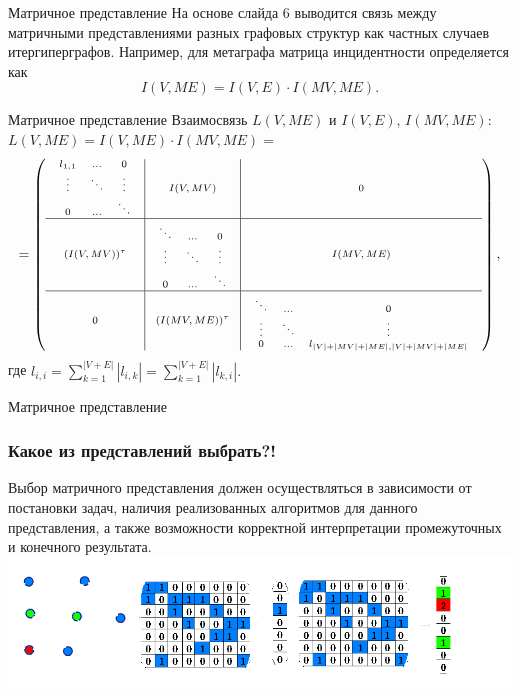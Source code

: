 \documentclass{beamer}
\begin{document}
\begin{darkframes}
		\begin{frame}{Матричное представление}
		 \centering
		 На основе слайда 6 выводится связь между матричными представлениями разных графовых структур как частных случаев итергиперграфов. Например, для метаграфа матрица инцидентности определяется как
			$$I(V,ME) = I(V,E) \cdot I(MV, ME).$$
		\end{frame}

		\begin{frame}{Матричное представление}
			\centering
			Взаимосвязь $L(V,ME)$ и $I(V,E)$, $I(MV,ME)$: $L(V,ME) = I(V,ME)\cdot I(MV,ME)=$
				 $$ \scriptsize =
					\left(
					\begin{array}{c|c|c}
					 \begin{array}{ccc}
					    l_{1,1} & ...& 0\\
					    \vdots& \ddots &\vdots \\
					    0&... & \ddots
					  \end{array}
					   & I(V, MV) & 0 \\
					\hline
					(I(V,MV))^\tau &  \begin{array}{ccc}
					    \ddots & ...& 0\\
					    \vdots& \ddots &\vdots \\
					    0&... & \ddots
					  \end{array} & I(MV, ME)  \\
					\hline
					0 & (I(MV,ME))^\tau &  \begin{array}{ccc}
					   \ddots & ...& 0\\
					    \vdots& \ddots &\vdots \\
					    0&... & l_{|V|+|MV|+|ME|,|V|+|MV|+|ME|}
					  \end{array}
					\end{array}
					\right),$$ где  $l_{i,i}=\sum\limits_{k=1}^{|V+E|} |l_{i,k}|=\sum\limits_{k=1}^{|V+E|} |l_{k,i}|.$
		\end{frame}

		\begin{frame}[label=simmonshall]{Матричное представление}
		\frametitle{Какое из представлений выбрать?!}
		\justifying
			Выбор матричного представления должен осуществляться в зависимости от \alert{постановки} задач, \alert{наличия реализованных алгоритмов} для данного представления, а также возможности \alert{корректной интерпретации} промежуточных и конечного результата.
			\vspace{0.5cm}
			\centering
			\includegraphics[width=0.9\paperwidth]{resources/algebra}


\end{frame}
\end{darkframes}
\end{document}
